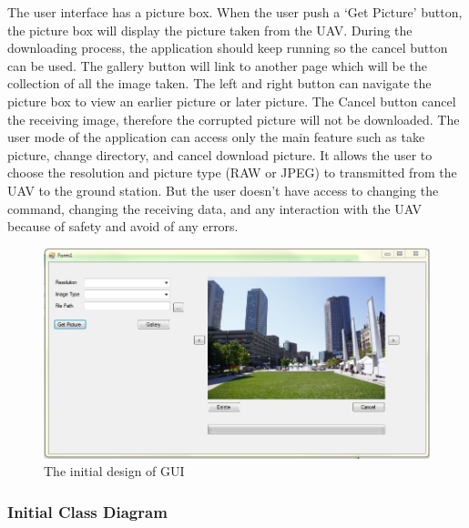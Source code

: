The user interface has a picture box. When the user push a ‘Get Picture’ button, the picture box will display the picture taken from the UAV. During the downloading process, the application should keep running so the cancel button can be used. The gallery button will link to another page which will be the collection of all the image taken. The left and right button can navigate the picture box to view an earlier picture or later picture. The Cancel button cancel the receiving image, therefore the corrupted picture will not be downloaded. The user mode of the application can access only the main feature such as take picture, change directory, and cancel download picture.  It allows the user to choose the resolution and picture type (RAW or JPEG) to transmitted from the UAV to the ground station. But the user doesn't have access to changing the command, changing the receiving data, and any interaction with the UAV because of safety and avoid of any errors. 
\begin{figure}[!hbtp]
\begin{center}
\includegraphics[scale=0.7]{figures/initialGUI.png} 
\end{center}
\caption{The initial design of GUI\label{ini_GUI}}
\end{figure}

\subsubsection{Initial Class Diagram}

